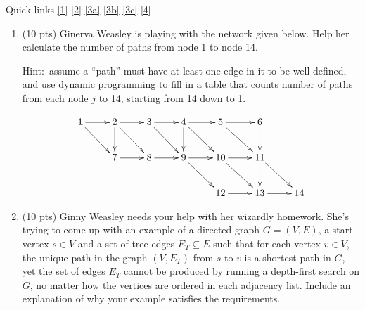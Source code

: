 \documentclass[12pt]{article}
\begin{document}
\renewcommand{\headrulewidth}{0.5pt}
\phantom{Test}

Quick links \ref{1} \ref{2} \ref{3a} \ref{3b} \ref{3c} \ref{4}


\vspace{-3mm}

\begin{enumerate}


\item \label{1} (10 pts) Ginerva Weasley is playing with the network given below. Help
her calculate the number of paths from node 1 to node 14.
	
Hint:\ assume a ``path'' must have at least one edge in it to be well defined,
and use dynamic programming to fill in a table that counts number of
paths from each node $j$ to 14, starting from 14 down to 1.

\[
\xymatrix{
1 \cir{} \ar[r] \ar[dr] & 2 \ar[r] \ar[dr] \ar[d] & 3 \ar[r] \ar[dr]  & 4 \ar[r] \ar[dr] \ar[d] & 5 \ar[r] \ar[dr]  & 6 \ar[d] \\
& 7 \ar[r] & 8 \ar[r] & 9 \ar[r] \ar[dr] & 10 \ar[r] \ar[dr] & 11 \ar[dr] \ar[d] \\ 
&    &    &    & 12 \ar[r] & 13 \ar[r] & 14
}
\]
\pagebreak

\item \label{2} (10 pts) Ginny Weasley needs your help with her wizardly homework. She's
trying to come up with an example of a directed graph $G=(V, E)$, a start
vertex $s \in V$ and a set of tree edges $E_{T} \subseteq E$ such that
for each vertex $v \in V$, the unique path in the graph $(V,E_{T})$
from $s$ to $v$ is a shortest path in $G$, yet the set of edges $E_{T}$
cannot be produced by running a depth-first search on $G$, no matter
how the vertices are ordered in each adjacency list. Include an
explanation of why your example satisfies the requirements.\\
\pagebreak



\end{enumerate}
\end{document}
